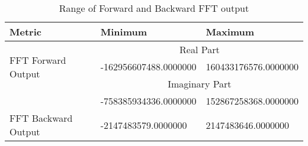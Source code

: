 \begin{table}[!h]
\centering
\caption{Range of Forward and Backward FFT output}
\label{Table 3.1}
\begin{tabular}{||m{4.5cm}|m{4.5cm}|m{4cm}||}
\hline
Metric & Minimum &Maximum\\[1.5ex]
\hline
\hline
\multirow{3}{*}{FFT Forward Output} & \multicolumn{2}{|c||}{Real Part}\\[1.5ex]
\cline{2-3}
 &-162956607488.0000000 &  160433176576.0000000  \\[1.5ex]
\cline{2-3}
 & \multicolumn{2}{|c||}{Imaginary Part} \\[1.5ex]
\cline{2-3}
 & -758385934336.0000000 &152867258368.0000000\\[1.5ex]
\hline
\hline
FFT Backward Output & -2147483579.0000000 & 2147483646.0000000\\[1.5ex]
\hline
\end{tabular}
\end{table}

